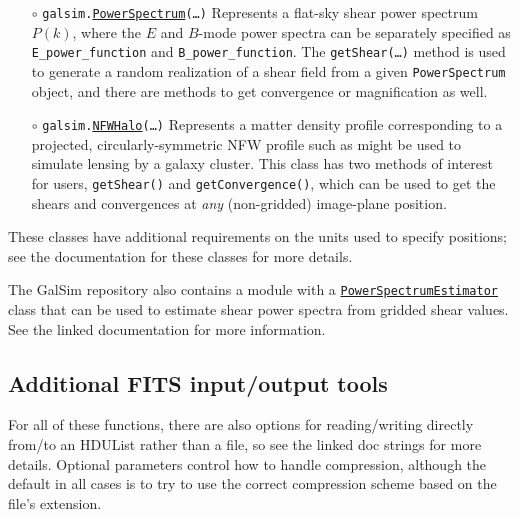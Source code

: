 \documentclass[preprint,10pt]{../../devel/modules/aastex}
\begin{document}
\begin{itemize}
  \item[$\circ$]
  \texttt{galsim.}\href{http://galsim-developers.github.io/GalSim/classgalsim_1_1lensing__ps_1_1_power_spectrum.html}{\texttt{PowerSpectrum}}\texttt{(\dots)}
    \newline
    Represents a flat-sky shear power spectrum $P(k)$, where the $E$ and
    $B$-mode power spectra can be separately specified as
    \texttt{E\_power\_function} and \texttt{B\_power\_function}.  The
    \texttt{getShear(\dots)} method is used to generate a random realization of
    a shear field from a given \texttt{PowerSpectrum} object,
    and there are methods to get convergence or magnification as well.

  \item[$\circ$]
  \texttt{galsim.}\href{http://galsim-developers.github.io/GalSim/classgalsim_1_1nfw__halo_1_1_n_f_w_halo.html}{\texttt{NFWHalo}}\texttt{(\dots)}
    \newline
    Represents a matter density profile corresponding to a projected,
    circularly-symmetric NFW profile such as might be used to simulate lensing
    by a galaxy cluster.  This class has two methods of interest for users,
    \texttt{getShear()} and \texttt{getConvergence()}, which can be used to get
    the shears and convergences at {\em any} (non-gridded) image-plane
    position.
\end{itemize}

These classes have additional requirements on the units used to specify
positions; see the documentation for these classes for more details.

The GalSim repository also contains a module with a
\href{http://galsim-developers.github.io/GalSim/classgalsim_1_1pse_1_1_power_spectrum_estimator.html}{\texttt{PowerSpectrumEstimator}} class that can be used to estimate shear power
spectra from gridded shear values.  See the linked documentation for more information.

\subsection{Additional FITS input/output tools}\label{sect:multifits}

For all of these functions, there are also options for reading/writing directly from/to
an HDUList rather than a file, so see the linked doc strings for more details.
Optional parameters control how to handle compression, although the default in all cases
is to try to use the correct compression scheme based on the file's extension.
\end{document}
